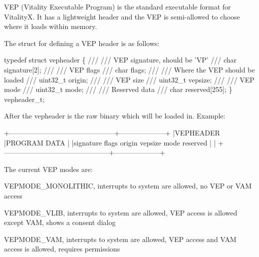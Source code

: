 V\+EP (Vitality Executable Program) is the standard executable format for VitalityX. It has a lightweight header and the V\+EP is semi-\/allowed to choose where it loads within memory.

The struct for defining a V\+EP header is as follows\+:


\begin{DoxyCode}
typedef struct vepheader \{
    ///
    /// VEP signature, should be 'VP'
    ///
    char signature[2];
    ///
    /// VEP flags
    /// 
    char flags;
    ///
    /// Where the VEP should be loaded
    ///
    uint32\_t origin;
    ///
    /// VEP size
    ///
    uint32\_t vepsize;
    ///
    /// VEP mode
    /// 
    uint32\_t mode;
    ///
    /// Reserved data
    /// 
    char reserved[255];
\} vepheader\_t;
\end{DoxyCode}


After the vepheader is the raw binary which will be loaded in. Example\+:


\begin{DoxyCode}
+---------------------------------------------+--------------------+
|VEPHEADER                                    |PROGRAM DATA        |
|signature flags origin vepsize mode reserved |                    |
+---------------------------------------------+--------------------+
\end{DoxyCode}


The current V\+EP modes are\+:
\begin{DoxyEnumerate}
\item V\+E\+P\+M\+O\+D\+E\+\_\+\+M\+O\+N\+O\+L\+I\+T\+H\+IC, interrupts to system are allowed, no V\+EP or V\+AM access
\item V\+E\+P\+M\+O\+D\+E\+\_\+\+V\+L\+IB, interrupts to system are allowed, V\+EP access is allowed except V\+AM, shows a consent dialog
\item V\+E\+P\+M\+O\+D\+E\+\_\+\+V\+AM, interrupts to system are allowed, V\+EP access and V\+AM access is allowed, requires permissions 
\end{DoxyEnumerate}